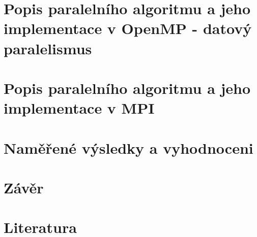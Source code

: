 \documentclass{article}
\begin{document}
\section{Popis paralelního algoritmu a jeho implementace v OpenMP - datový paralelismus}

\section{Popis paralelního algoritmu a jeho implementace v MPI}

\section{Naměřené výsledky a vyhodnoceni}

\section{Závěr}

\section{Literatura}
\end{document}
